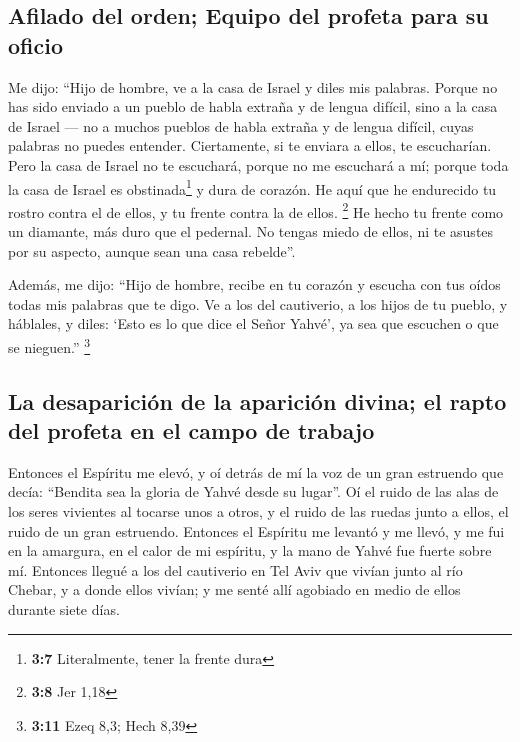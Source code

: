 \hypertarget{afilado-del-orden-equipo-del-profeta-para-su-oficio}{%
\subsection{Afilado del orden; Equipo del profeta para su
oficio}\label{afilado-del-orden-equipo-del-profeta-para-su-oficio}}

 Me dijo: ``Hijo de hombre, ve a la casa de Israel y diles
mis palabras.  Porque no has sido enviado a un pueblo de
habla extraña y de lengua difícil, sino a la casa de Israel ---
 no a muchos pueblos de habla extraña y de lengua difícil,
cuyas palabras no puedes entender. Ciertamente, si te enviara a ellos,
te escucharían.  Pero la casa de Israel no te escuchará,
porque no me escuchará a mí; porque toda la casa de Israel es
obstinada\footnote{\textbf{3:7} Literalmente, tener la frente dura} y
dura de corazón.  He aquí que he endurecido tu rostro
contra el de ellos, y tu frente contra la de ellos. \footnote{\textbf{3:8}
  Jer 1,18}  He hecho tu frente como un diamante, más duro
que el pedernal. No tengas miedo de ellos, ni te asustes por su aspecto,
aunque sean una casa rebelde''.

 Además, me dijo: ``Hijo de hombre, recibe en tu corazón
y escucha con tus oídos todas mis palabras que te digo. 
Ve a los del cautiverio, a los hijos de tu pueblo, y háblales, y diles:
`Esto es lo que dice el Señor Yahvé', ya sea que escuchen o que se
nieguen.'' \footnote{\textbf{3:11} Ezeq 8,3; Hech 8,39}

\hypertarget{la-desapariciuxf3n-de-la-apariciuxf3n-divina-el-rapto-del-profeta-en-el-campo-de-trabajo}{%
\subsection{La desaparición de la aparición divina; el rapto del profeta
en el campo de
trabajo}\label{la-desapariciuxf3n-de-la-apariciuxf3n-divina-el-rapto-del-profeta-en-el-campo-de-trabajo}}

 Entonces el Espíritu me elevó, y oí detrás de mí la voz
de un gran estruendo que decía: ``Bendita sea la gloria de Yahvé desde
su lugar''.  Oí el ruido de las alas de los seres
vivientes al tocarse unos a otros, y el ruido de las ruedas junto a
ellos, el ruido de un gran estruendo.  Entonces el
Espíritu me levantó y me llevó, y me fui en la amargura, en el calor de
mi espíritu, y la mano de Yahvé fue fuerte sobre mí. 
Entonces llegué a los del cautiverio en Tel Aviv que vivían junto al río
Chebar, y a donde ellos vivían; y me senté allí agobiado en medio de
ellos durante siete días.

